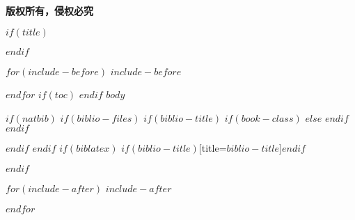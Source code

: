 \documentclass[$if(fontsize)$$fontsize$,$endif$$if(lang)$$lang$,$endif$CJKutf8]{$documentclass$}
\begin{document}
\begin{center}
  {\bf 版权所有，侵权必究}
\end{center}

\newpage
{}
$if(title)$
\maketitle
$endif$

$for(include-before)$
$include-before$

$endfor$
$if(toc)$
{
\hypersetup{linkcolor=blue}
\tableofcontents
}
$endif$
$body$

$if(natbib)$
$if(biblio-files)$
$if(biblio-title)$
$if(book-class)$
\renewcommand\bibname{$biblio-title$}
$else$
\renewcommand\refname{$biblio-title$}
$endif$
$endif$


$endif$
$endif$
$if(biblatex)$
\printbibliography$if(biblio-title)$[title=$biblio-title$]$endif$

$endif$

$for(include-after)$
$include-after$

$endfor$


\end{document}

